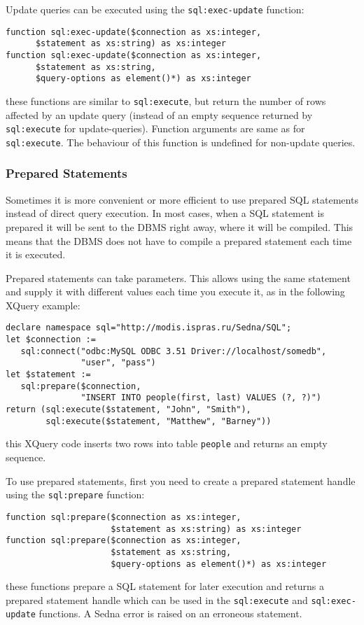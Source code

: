 \documentclass[a4paper,12pt]{article}
\begin{document}
Update queries can be executed using the \verb!sql:exec-update! function:
\begin{verbatim}
function sql:exec-update($connection as xs:integer,
      $statement as xs:string) as xs:integer
function sql:exec-update($connection as xs:integer,
      $statement as xs:string,
      $query-options as element()*) as xs:integer
\end{verbatim}
these functions are similar to \verb!sql:execute!, but return the number of rows
affected by an update query (instead of an empty sequence returned by
\verb!sql:execute! for update-queries). Function arguments are same as for
\verb!sql:execute!. The behaviour of this function is undefined for non-update
queries.


\subsubsection*{Prepared Statements}
Sometimes it is more convenient or more efficient to use prepared SQL statements
instead of direct query execution. In most cases, when a SQL statement is
prepared it will be sent to the DBMS right away, where it will be compiled. This
means that the DBMS does not have to compile a prepared statement each time it
is executed.

Prepared statements can take parameters. This allows using the same statement
and supply it with different values each time you execute it, as in the
following XQuery example:
\small{
\begin{verbatim}
declare namespace sql="http://modis.ispras.ru/Sedna/SQL";
let $connection :=
   sql:connect("odbc:MySQL ODBC 3.51 Driver://localhost/somedb",
               "user", "pass")
let $statement :=
   sql:prepare($connection,
               "INSERT INTO people(first, last) VALUES (?, ?)")
return (sql:execute($statement, "John", "Smith"),
        sql:execute($statement, "Matthew", "Barney"))
\end{verbatim}}
\noindent
this XQuery code inserts two rows into table \verb!people! and returns an empty
sequence.

To use prepared statements, first you need to create a prepared statement handle
using the \verb!sql:prepare! function:
\small{
\begin{verbatim}
function sql:prepare($connection as xs:integer,
                     $statement as xs:string) as xs:integer
function sql:prepare($connection as xs:integer,
                     $statement as xs:string,
                     $query-options as element()*) as xs:integer
\end{verbatim}}
\noindent
these functions prepare a SQL statement for later execution and returns a
prepared statement handle which can be used in the \verb!sql:execute! and
\verb!sql:exec-update! functions. A Sedna error is raised on an erroneous
statement.
\end{document}
